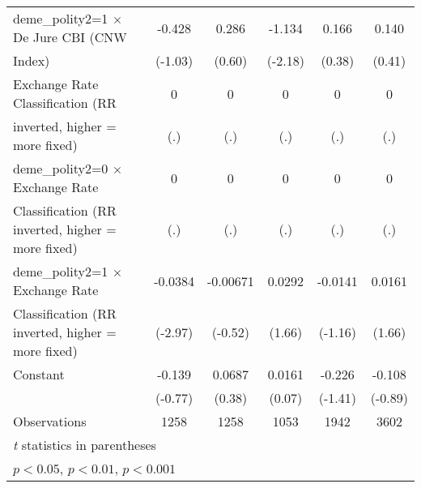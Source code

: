 {\begin{tabular}{l*{5}{c}}
\addlinespace
deme\_polity2=1 $\times$ De Jure CBI (CNW&   -0.428         &    0.286         &   -1.134\sym{*}  &    0.166         &    0.140         \\
Index)                                  &  (-1.03)         &   (0.60)         &  (-2.18)         &   (0.38)         &   (0.41)         \\
\addlinespace
Exchange Rate Classification (RR        &        0         &        0         &        0         &        0         &        0         \\
inverted, higher = more fixed)          &      (.)         &      (.)         &      (.)         &      (.)         &      (.)         \\
\addlinespace
deme\_polity2=0 $\times$ Exchange Rate   &        0         &        0         &        0         &        0         &        0         \\
Classification (RR inverted, higher = more fixed)&      (.)         &      (.)         &      (.)         &      (.)         &      (.)         \\
\addlinespace
deme\_polity2=1 $\times$ Exchange Rate   &  -0.0384\sym{**} & -0.00671         &   0.0292         &  -0.0141         &   0.0161         \\
Classification (RR inverted, higher = more fixed)&  (-2.97)         &  (-0.52)         &   (1.66)         &  (-1.16)         &   (1.66)         \\
\addlinespace
Constant                                &   -0.139         &   0.0687         &   0.0161         &   -0.226         &   -0.108         \\
                                        &  (-0.77)         &   (0.38)         &   (0.07)         &  (-1.41)         &  (-0.89)         \\
\midrule
Observations                            &     1258         &     1258         &     1053         &     1942         &     3602         \\
\bottomrule
\multicolumn{6}{l}{\footnotesize \textit{t} statistics in parentheses}\\
\multicolumn{6}{l}{\footnotesize \sym{*} \(p<0.05\), \sym{**} \(p<0.01\), \sym{***} \(p<0.001\)}\\
\end{tabular}
}
